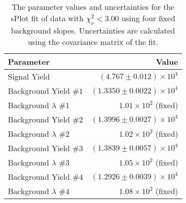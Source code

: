 
\begin{table}[ht]
    \begin{center}
        \begin{tabular}{lr}\toprule
            Parameter & Value \\\midrule
            Signal Yield & $(4.767 \pm 0.012) \times 10^{4}$ \\
            Background Yield $\#1$ & $(1.3350 \pm 0.0022) \times 10^{4}$ \\
            Background $\lambda$ $\#1$ & $1.01 \times 10^{2}$ (fixed) \\
            Background Yield $\#2$ & $(1.3996 \pm 0.0027) \times 10^{4}$ \\
            Background $\lambda$ $\#2$ & $1.02 \times 10^{2}$ (fixed) \\
            Background Yield $\#3$ & $(1.3839 \pm 0.0057) \times 10^{4}$ \\
            Background $\lambda$ $\#3$ & $1.05 \times 10^{2}$ (fixed) \\
            Background Yield $\#4$ & $(1.2926 \pm 0.0039) \times 10^{4}$ \\
            Background $\lambda$ $\#4$ & $1.08 \times 10^{2}$ (fixed) \\\bottomrule
        \end{tabular}
        \caption{The parameter values and uncertainties for the sPlot fit of data with $\chi^2_\nu < 3.00$ using four fixed background slopes. Uncertainties are calculated using the covariance matrix of the fit.}\label{tab:splot-fit-results-chisqdof-3.00-fixed-4}
    \end{center}
\end{table}
